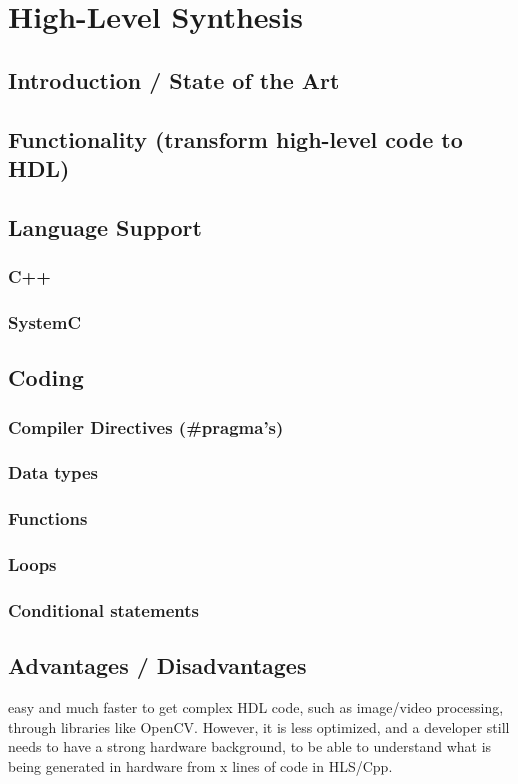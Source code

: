 \chapter{High-Level Synthesis}
  \section{Introduction / State of the Art}
  \section{Functionality (transform high-level code to HDL)}
  \section{Language Support}
    \subsection{C++}
    \subsection{SystemC}
  \section{Coding}
    \subsection{Compiler Directives (\#pragma's)}
    \subsection{Data types}
    \subsection{Functions}
    \subsection{Loops}
    \subsection{Conditional statements}
  \section{Advantages / Disadvantages}
    easy and much faster to get complex HDL code, such as image/video processing, through libraries like OpenCV. However, it is less optimized, and a developer still needs to have a strong hardware background, to be able to understand what is being generated in hardware from x lines of code in HLS/Cpp.

